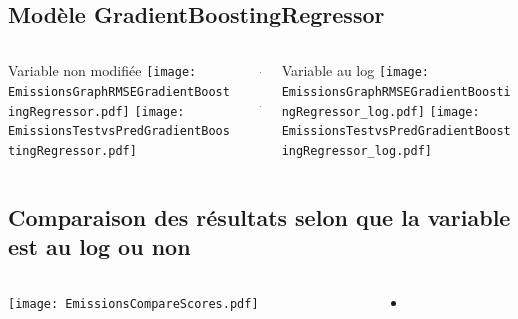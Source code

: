 \documentclass[8pt,aspectratio=169,hyperref={unicode=true}]{beamer}
\begin{document}
\subsection{Modèle GradientBoostingRegressor}
\begin{frame}{\insertsubsection}
  \begin{columns}[t]
    \begin{column}{.33\textwidth}
      \centering Variable non modifiée
      \texttt{[image: EmissionsGraphRMSEGradientBoostingRegressor.pdf]}
      \texttt{[image: EmissionsTestvsPredGradientBoostingRegressor.pdf]}
    \end{column}
    \begin{column}{.33\textwidth}
      $\Longleftarrow$
      \scriptsize
      {\centering
        }
      

      \normalsize
      $\Longleftarrow$

      \raggedleft{$\Longrightarrow$}
      \scriptsize
      {\centering
        }
      

      \normalsize
      \raggedleft{$\Longrightarrow$}
    \end{column}
    \begin{column}{.33\textwidth}
      \centering Variable au log
      \texttt{[image: EmissionsGraphRMSEGradientBoostingRegressor\_log.pdf]}
      \texttt{[image: EmissionsTestvsPredGradientBoostingRegressor\_log.pdf]}
    \end{column}
  \end{columns}
\end{frame}

\subsection{Comparaison des résultats selon que la variable est au log ou non}
\begin{frame}{\insertsubsection}
  \begin{columns}
    \begin{column}{.5\textwidth}
      \centering
      \texttt{[image: EmissionsCompareScores.pdf]}
    \end{column}
    \begin{column}{.5\textwidth}
      \begin{itemize}
        \item
      \end{itemize}
    \end{column}
  \end{columns}
\end{frame}
\end{document}

